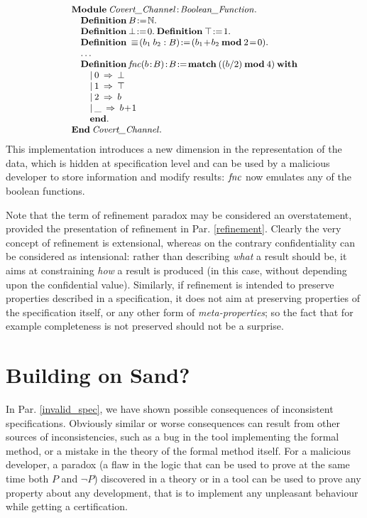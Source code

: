 \documentclass[conference]{IEEEtran}
\begin{document}
\[\small\begin{array}{l}
\Cmd{Module}\:\fid{Covert\_Channel}\!:\!\fid{Boolean\_Function}.\\
\quad\Cmd{Definition}\:B\!:=\!\NAT.\\
\quad\Cmd{Definition}\:\bot\!:=\!0.\:\Cmd{Definition}\:\top\!:=\!1.\\
\quad\Cmd{Definition}\:\equiv\!(b_1\:b_2:B)\!:=\!(b_1\!+\!b_2\:\Cmd{mod}\:2\!=\!0).\\
\quad\ldots\\
\quad\Cmd{Definition}\:\fid{fnc}(b\!:\!B)\!:\!B\!:=\!
\Cmd{match}\:((b/2)\:\Cmd{mod}\:4)\:\Cmd{with}\\
\quad\quad|\:0\:\Rightarrow\:\bot\\
\quad\quad|\:1\:\Rightarrow\:\top\\
\quad\quad|\:2\:\Rightarrow\:b\\
\quad\quad|\:\_\:\Rightarrow\:b\!+\!1\\
\quad\quad\Cmd{end}.\\
\Cmd{End}\:\fid{Covert\_Channel}.
\end{array}\]
This implementation introduces a new dimension in the representation of the data, which is
hidden at specification level and can be used by a malicious developer to store information
and modify results: {\small$\textrm{\emph{fnc}}$} now emulates any of the boolean functions.

Note that the term of refinement paradox may be considered an overstatement, provided the
presentation of refinement in Par. \ref{refinement}. Clearly the very concept of refinement is
extensional, whereas on the contrary confidentiality can be considered as intensional: rather
than describing \emph{what} a result should be, it aims at constraining \emph{how} a result is
produced (in this case, without depending upon the confidential value). Similarly, if
refinement is intended to preserve properties described in a specification, it does not aim at
preserving properties of the specification itself, or any other form of
\emph{meta-properties}; so the fact that for example completeness is not preserved should not
be a surprise.

\section{Building on Sand?}\label{building_sand}

In Par. \ref{invalid_spec}, we have shown possible consequences of inconsistent
specifications. Obviously similar or worse consequences can result from other sources of
inconsistencies, such as a bug in the tool implementing the formal method, or a mistake in the
theory of the formal method itself. For a malicious developer, a paradox (a flaw in the logic
that can be used to prove at the same time both {\small$P$} and {\small$\lnot P$}) discovered
in a theory or in a tool can be used to prove any property about any development, that is to
implement any unpleasant behaviour while getting a certification.
\end{document}
